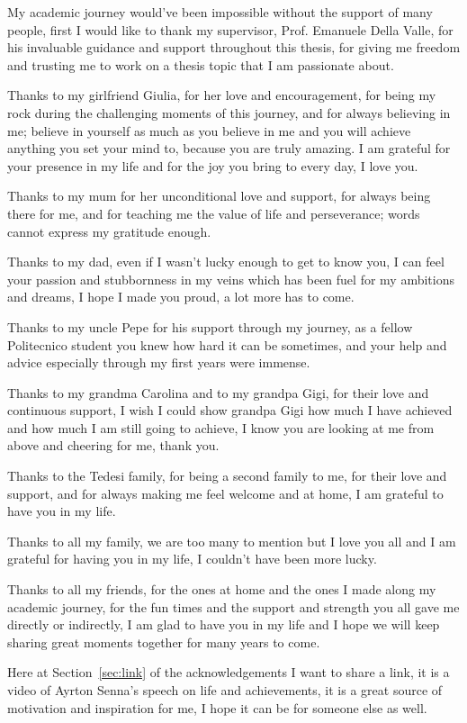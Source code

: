 \documentclass{Configuration_Files/PoliMi3i_thesis}
\begin{document}
My academic journey would've been impossible without the support of many people, first I would like to thank my supervisor, Prof. Emanuele Della Valle,
for his invaluable guidance and support throughout this thesis, for giving me freedom and trusting me to work on a thesis topic that I am passionate about.

Thanks to my girlfriend Giulia, for her love and encouragement, for being my rock during the challenging moments of this journey, and for always believing in me; believe in
yourself as much as you believe in me and you will achieve anything you set your mind to, because you are truly amazing. I am grateful for your presence in my life and for the
joy you bring to every day, I love you.

Thanks to my mum for her unconditional love and support, for always being there for me, and for teaching me the value of life and perseverance; words cannot express
my gratitude enough.

Thanks to my dad, even if I wasn't lucky enough to get to know you, I can feel your passion and stubbornness in my veins which has been fuel for my ambitions and dreams,
I hope I made you proud, a lot more has to come.

Thanks to my uncle Pepe for his support through my journey, as a fellow Politecnico student you knew how hard it can be sometimes, and your help and advice especially
through my first years were immense.

Thanks to my grandma Carolina and to my grandpa Gigi, for their love and continuous support, I wish I could show grandpa Gigi how much I have achieved and how much I am still
going to achieve, I know you are looking at me from above and cheering for me, thank you.

Thanks to the Tedesi family, for being a second family to me, for their love and support, and for always making me feel welcome and at home, I am grateful to have you in my life.

Thanks to all my family, we are too many to mention but I love you all and I am grateful for having you in my life, I couldn't have been more lucky.

Thanks to all my friends, for the ones at home and the ones I made along my academic journey, for the fun times and the support and strength you all gave me directly
or indirectly, I am glad to have you in my life and I hope we will keep sharing great moments together for many years to come.

Here at Section~\ref{sec:link} of the acknowledgements I want to share a link, it is a video of Ayrton Senna's speech on life and achievements, it is a great source of motivation and inspiration
for me, I hope it can be for someone else as well.
\end{document}
